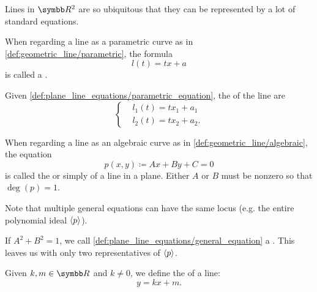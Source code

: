 \begin{definition}\label{def:plane_line_equations}
  Lines in \( \BR^2 \) are so ubiquitous that they can be represented by a lot of standard equations.

  \begin{defenum}
     When regarding a line as a parametric curve as in \cref{def:geometric_line/parametric}, the formula
    \begin{equation}\label{def:plane_line_equations/parametric_equation}
      l(t) = tx + a
    \end{equation}
    is called a .

     Given \cref{def:plane_line_equations/parametric_equation}, the  of the line are
    \begin{equation}\label{def:plane_line_equations/scalar_parametric_equations}
      \begin{cases}
        &l_1(t) = t x_1 + a_1 \\
        &l_2(t) = t x_2 + a_2.
      \end{cases}
    \end{equation}

     When regarding a line as an algebraic curve as in \cref{def:geometric_line/algebraic}, the equation
    \begin{equation}\label{def:plane_line_equations/general_equation}
      p(x, y) \coloneqq Ax + By + C = 0
    \end{equation}
    is called the  or simply  of a line in a plane. Either \( A \) or \( B \) must be nonzero so that \( \deg(p) = 1 \).

    Note that multiple general equations can have the same locus (e.g. the entire polynomial ideal \( \left\langle p \right\rangle \)).

     If \( A^2 + B^2 = 1 \), we call \cref{def:plane_line_equations/general_equation} a . This leaves us with only two representatives of \( \left\langle p \right\rangle \).

     Given \( k, m \in \BR \) and  \( k \neq 0 \), we define the  of a line:
    \begin{equation}\label{def:plane_line_equations/cartesian_equation}
      y = kx + m.
    \end{equation}


\end{defenum}
\end{definition}
